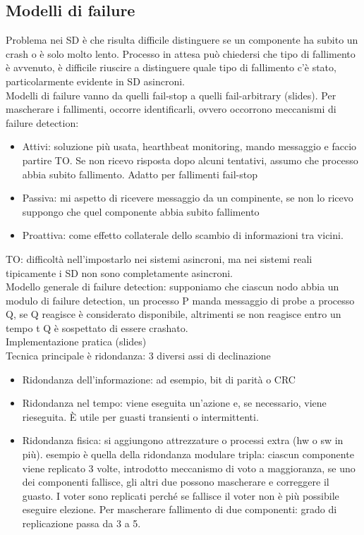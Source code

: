 \documentclass[16px]{article}
\begin{document}
\subsection{Modelli di failure}
Problema nei SD è che risulta difficile distinguere se un componente ha subito un crash o è solo molto lento. Processo in attesa può chiedersi che tipo di fallimento è avvenuto, è difficile riuscire a distinguere quale tipo di fallimento c'è stato, particolarmente evidente in SD asincroni.\\ Modelli di failure vanno da quelli fail-stop a quelli fail-arbitrary (slides). Per mascherare i fallimenti, occorre identificarli, ovvero occorrono meccanismi di failure detection:
\begin{itemize}
\item Attivi: soluzione più usata, hearthbeat monitoring, mando messaggio e faccio partire TO. Se non ricevo risposta dopo alcuni tentativi, assumo che processo abbia subito fallimento. Adatto per fallimenti fail-stop
\item Passiva: mi aspetto di ricevere messaggio da un compinente, se non lo ricevo suppongo che quel componente abbia subito fallimento
\item Proattiva: come effetto collaterale dello scambio di informazioni tra vicini.
\end{itemize}
TO: difficoltà nell'impostarlo nei sistemi asincroni, ma nei sistemi reali tipicamente i SD non sono completamente asincroni.\\ Modello generale di failure detection: supponiamo che ciascun nodo abbia un modulo di failure detection, un processo P manda messaggio di probe a processo Q, se Q reagisce è considerato disponibile, altrimenti se non reagisce entro un tempo t Q è sospettato di essere crashato.\\ Implementazione pratica (slides)\\ Tecnica principale è ridondanza: 3 diversi assi di declinazione
\begin{itemize}
\item Ridondanza dell'informazione: ad esempio, bit di parità o CRC
\item Ridondanza nel tempo: viene eseguita un'azione e, se necessario, viene rieseguita. È utile per guasti transienti o intermittenti.
\item Ridondanza fisica: si aggiungono attrezzature o processi extra (hw o sw in più). esempio è quella della ridondanza modulare tripla: ciascun componente viene replicato 3 volte, introdotto meccanismo di voto a maggioranza, se uno dei componenti fallisce, gli altri due possono mascherare e correggere il guasto. I voter sono replicati perché se fallisce il voter non è più possibile eseguire elezione. Per mascherare fallimento di due componenti: grado di replicazione passa da 3 a 5.
\end{itemize}
\end{document}
